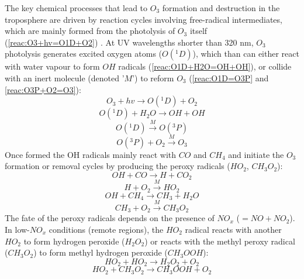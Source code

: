 \documentclass[11pt,a4paper]{article}
\begin{document}
The key chemical processes that lead to $O_3$ formation and destruction in the troposphere are driven by reaction cycles involving free-radical intermediates, which are mainly formed from the photolysis of $O_3$ itself (\ref{reac:O3+hv=O1D+O2}) \citep{Fowler2008}. At UV wavelengths shorter than 320 nm, $O_3$ photolysis generates excited oxygen atoms ($O(^1D)$), which than can either react with water vapour to form $OH$ radicals (\ref{reac:O1D+H2O=OH+OH}), or collide with an inert molecule (denoted '$M$') to reform $O_3$ (\ref{reac:O1D=O3P} and \ref{reac:O3P+O2=O3}):
\begin{equation} \label{reac:O3+hv=O1D+O2}
O_3 + hv \rightarrow O(^1D) + O_2
\end{equation}
\begin{equation} \label{reac:O1D+H2O=OH+OH}
O(^1D) + H_2O \rightarrow OH + OH
\end{equation}
\begin{equation} \label{reac:O1D=O3P}
O(^1D) \xrightarrow{M} O(^3P)
\end{equation}
\begin{equation} \label{reac:O3P+O2=O3}
O(^3P) + O_2 \xrightarrow{M} O_3
\end{equation}
Once formed the OH radicals mainly react with $CO$ and $CH_4$ and initiate the $O_3$ formation or removal cycles by producing the peroxy radicals ($HO_2$, $CH_3O_2$):
\begin{equation} \label{reac:OH+CO=H+CO2}
OH + CO \rightarrow H + CO_2
\end{equation}
\begin{equation} \label{reac:H+O2=HO2}
H + O_2 \xrightarrow{M} HO_2
\end{equation}
\begin{equation} \label{reac:OH+CH4=CH3+H2O}
OH + CH_4 \rightarrow CH_3 + H_2O
\end{equation}
\begin{equation} \label{reac:CH3O+O2=CH3O2}
CH_3 + O_2 \xrightarrow{M} CH_3O_2
\end{equation}
The fate of the peroxy radicals depends on the presence of $NO_x$ ($=NO + NO_2$). In low-$NO_x$ conditions (remote regions), the $HO_2$ radical reacts with another $HO_2$ to form hydrogen peroxide ($H_2O_2$) or reacts with the methyl peroxy radical ($CH_3O_2$) to form methyl hydrogen peroxide ($CH_3OOH$):
\begin{equation} \label{reac:HO2+HO2=H2O2+O2}
HO_2 + HO_2 \rightarrow H_2O_2 + O_2
\end{equation}
\begin{equation} \label{reac:HO2+CH3O2=CH3OOH+O2}
HO_2 + CH_3O_2 \rightarrow CH_3OOH + O_2
\end{equation}
\end{document}

